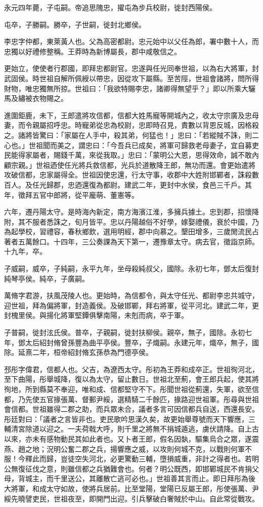\begin{pinyinscope}
永元四年薨，子屯嗣。帝追思隗忠，擢屯為步兵校尉，徙封西陽侯。

屯卒，子勝嗣。勝卒，子世嗣，徙封北鄉侯。

李忠字仲都，東萊黃人也。父為高密都尉。忠元始中以父任為郎，署中數十人，而忠獨以好禮修整稱。王莽時為新博屬長，郡中咸敬信之。

更始立，使使者行郡國，即拜忠都尉官。忠遂與任光同奉世祖，以為右大將軍，封武固侯。時世祖自解所佩綬以帶忠，因從攻下屬縣。至苦陘，世祖會諸將，問所得財物，唯忠獨無所掠。世祖曰：「我欲特賜李忠，諸卿得無望乎？」即以所乘大驪馬及繡被衣物賜之。

進圍鉅鹿，未下，王郎遣將攻信都，信都大姓馬寵等開城內之，收太守宗廣及忠母妻，而令親屬招呼忠。時寵弟從忠為校尉，忠即時召見，責數以背恩反城，因格殺之。諸將皆驚曰：「家屬在人手中，殺其弟，何猛也！」忠曰：「若縱賊不誅，則二心也。」世祖聞而美之，謂忠曰：「今吾兵已成矣，將軍可歸救老母妻子，宜自募吏民能得家屬者，賜錢千萬，來從我取。」忠曰：「蒙明公大恩，思得效命，誠不敢內顧宗親。」世祖迺使任光將兵救信都，光兵於道散降王郎，無功而還。會更始遣將攻破信都，忠家屬得全。世祖因使忠還，行太守事，收郡中大姓附邯鄲者，誅殺數百人。及任光歸郡，忠迺還復為都尉。建武二年，更封中水侯，食邑三千戶。其年，徵拜五官中郎將，從平龐萌、董憲等。

六年，遷丹陽太守。是時海內新定，南方海濱江淮，多擁兵據土。忠到郡，招懷降附，其不服者悉誅之，旬月皆平。忠以丹陽越俗不好學，嫁娶禮儀，衰於中國，乃為起學校，習禮容，春秋鄉飲，選用明經，郡中向慕之。墾田增多，三歲閒流民占著者五萬餘口。十四年，三公奏課為天下第一，遷豫章太守。病去官，徵詣京師。十九年，卒。

子威嗣，威卒，子純嗣，永平九年，坐母殺純叔父，國除。永初七年，鄧太后復封純琴亭侯。純卒，子廣嗣。

萬脩字君游，扶風茂陵人也。更始時，為信都令，與太守任光、都尉李忠共城守，迎世祖，拜為偏將軍，封造義侯。及破邯鄲，拜右將軍，從平河北。建武二年，更封槐里侯。與揚化將軍堅鐔俱擊南陽，未剋而病，卒于軍。

子普嗣，徙封泫氏侯。普卒，子親嗣，徙封扶柳侯。親卒，無子，國除。永初七年，鄧太后紹封脩曾孫豐為曲平亭侯。豐卒，子熾嗣。永建元年，熾卒，無子，國除。延熹二年，桓帝紹封脩玄孫恭為門德亭侯。

邳彤字偉君，信都人也。父吉，為遼西太守。彤初為王莽和成卒正。世祖徇河北，至下曲陽，彤舉城降，復以為太守，留止數日。世祖北至薊，會王郎兵起，使其將徇地，所到縣莫不奉迎，唯和成、信都堅守不下。彤聞世祖從薊還，失軍，欲至信都，乃先使五官掾張萬、督郵尹綏，選精騎二千餘匹，掾路迎世祖軍。彤尋與世祖會信都。世祖雖得二郡之助，而兵眾未合，議者多言可因信都兵自送，西還長安。彤廷對曰：「議者之言皆非也。吏民歌吟思漢久矣，故更始舉尊號而天下響應，三輔清宮除道以迎之。一夫荷戟大呼，則千里之將無不捐城遁逃，虜伏請降。自上古以來，亦未有感物動民其如此者也。又卜者王郎，假名因埶，驅集烏合之眾，遂震燕、趙之地；況明公奮二郡之兵，揚響應之威，以攻則何城不克，以戰則何軍不服！今釋此而歸，豈徒空失河北，必更驚動三輔，墮損威重，非計之得者也。若明公無復征伐之意，則雖信都之兵猶難會也。何者？明公既西，即邯鄲城民不肯捐父母，背城主，而千里送公，其離散亡逃可必也。」世祖善其言而止。即日拜彤為後大將軍，和成太守如故，使將兵居前。比至堂陽，堂陽已反屬王郎，彤使張萬、尹綏先曉譬吏民，世祖夜至，即開門出迎。引兵擊破白奢賊於中山。自此常從戰攻。


\end{pinyinscope}
